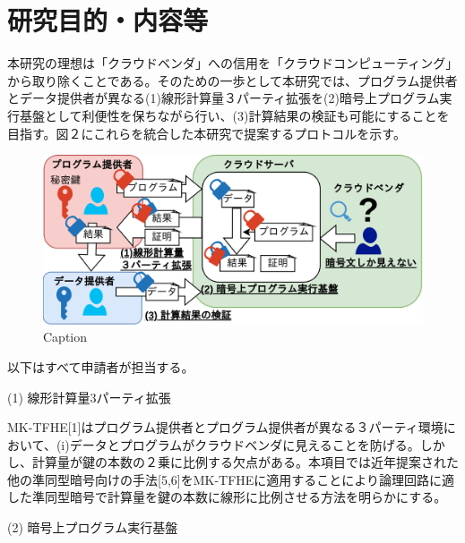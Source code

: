 
\section{研究目的・内容等}


本研究の理想は「クラウドベンダ」への信用を「クラウドコンピューティング」から取り除くことである。そのための一歩として本研究では、プログラム提供者とデータ提供者が異なる(1)線形計算量３パーティ拡張を(2)暗号上プログラム実行基盤として利便性を保ちながら行い、(3)計算結果の検証も可能にすることを目指す。図２にこれらを統合した本研究で提案するプロトコルを示す。

\begin{figure}[h]
    \centering
    \includegraphics[width=0.8\linewidth]{figures/solution.drawio.png}
    \vspace*{-0.5cm}
    \caption{Caption}
    \label{fig:solution}
\end{figure}


以下はすべて申請者が担当する。

\noindent(1) 線形計算量3パーティ拡張

MK-TFHE[1]はプログラム提供者とプログラム提供者が異なる３パーティ環境において、(i)データとプログラムがクラウドベンダに見えることを防げる。しかし、計算量が鍵の本数の２乗に比例する欠点がある。本項目では近年提案された他の準同型暗号向けの手法[5,6]をMK-TFHEに適用することにより論理回路に適した準同型暗号で計算量を鍵の本数に線形に比例させる方法を明らかにする。

\noindent(2) 暗号上プログラム実行基盤

